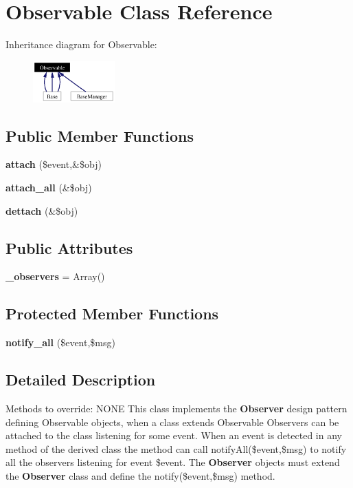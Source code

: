 \section{Observable Class Reference}
\label{classObservable}
Inheritance diagram for Observable:\begin{figure}[H]
\begin{center}
\leavevmode
\includegraphics[width=89pt]{classObservable__inherit__graph}
\end{center}
\end{figure}
\subsection*{Public Member Functions}
\begin{CompactItemize}
\item 
{\bf attach} (\$event,\&\$obj)
\item 
{\bf attach\_\-all} (\&\$obj)
\item 
{\bf dettach} (\&\$obj)
\end{CompactItemize}
\subsection*{Public Attributes}
\begin{CompactItemize}
\item 
{}
{\bf \_\-observers} = Array()\label{classObservable_m0}

\end{CompactItemize}
\subsection*{Protected Member Functions}
\begin{CompactItemize}
\item 
{\bf notify\_\-all} (\$event,\$msg)
\end{CompactItemize}


\subsection{Detailed Description}
Methods to override: NONE This class implements the {\bf Observer} design pattern defining Observable objects, when a class extends Observable Observers can be attached to the class listening for some event. When an event is detected in any method of the derived class the method can call notify\-All(\$event,\$msg) to notify all the observers listening for event \$event. The {\bf Observer} objects must extend the {\bf Observer} class and define the notify(\$event,\$msg) method. 



